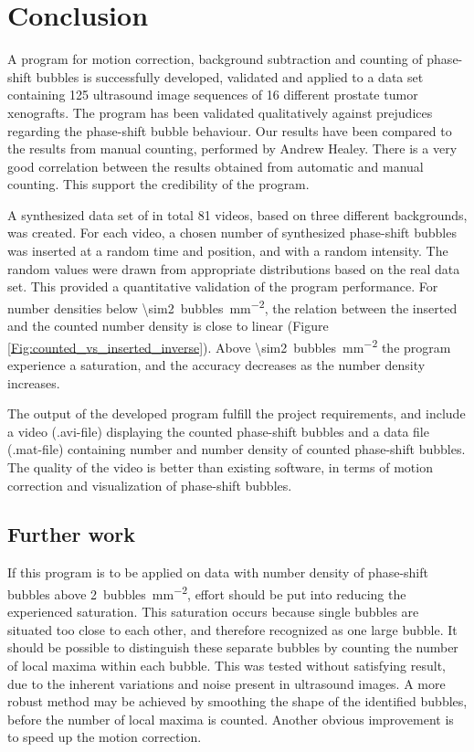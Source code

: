 
\section{Conclusion}
A program for motion correction, background subtraction and counting of phase-shift bubbles is successfully developed, validated and applied to a data set containing 125 ultrasound image sequences of 16 different prostate tumor xenografts. The program has been validated qualitatively against prejudices regarding the phase-shift bubble behaviour. Our results have been compared to the results from manual counting, performed by Andrew Healey\cite{2014}. There is a very good correlation between the results obtained from automatic and manual counting. This support the credibility of the program.

A synthesized data set of in total 81 videos, based on three different backgrounds, was created. For each video, a chosen number of synthesized phase-shift bubbles was inserted at a random time and position, and with a random intensity. The random values were drawn from appropriate distributions based on the real data set. This provided a quantitative validation of the program performance. For number densities below \SI{\sim2}{bubbles\per\milli\meter\squared}, the relation between the inserted and the counted number density is close to linear (Figure \ref{Fig:counted_vs_inserted_inverse}). Above \SI{\sim2}{bubbles\per\milli\meter\squared} the program experience a saturation, and the accuracy decreases as the number density increases. 

The output of the developed program fulfill the project requirements, and include a video (.avi-file) displaying the counted phase-shift bubbles and a data file (.mat-file) containing number and number density of counted phase-shift bubbles. The quality of the video is better than existing software, in terms of motion correction and visualization of phase-shift bubbles.


\subsection{Further work}
If this program is to be applied on data with number density of phase-shift bubbles above \SI{2}{bubbles\per\milli\meter\squared}, effort should be put into reducing the experienced saturation. This saturation occurs because single bubbles are situated too close to each other, and therefore recognized as one large bubble. It should be possible to distinguish these separate bubbles by counting the number of local maxima within each bubble. This was tested without satisfying result, due to the inherent variations and noise present in ultrasound images. A more robust method may be achieved by smoothing the shape of the identified bubbles, before the number of local maxima is counted. Another obvious improvement is to speed up the motion correction.
	
